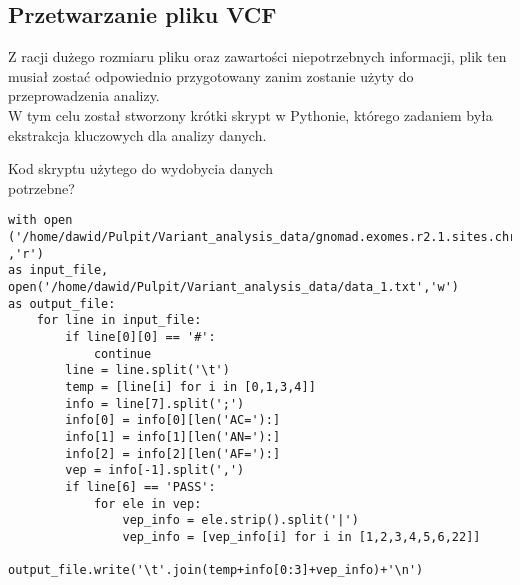 \documentclass[12pt]{article}
\begin{document}
\subsection{Przetwarzanie pliku VCF}\indent

Z racji dużego rozmiaru pliku oraz zawartości niepotrzebnych informacji, plik ten musiał zostać odpowiednio przygotowany zanim zostanie użyty do przeprowadzenia analizy. \\ 
W tym celu został stworzony krótki skrypt w Pythonie, którego zadaniem była ekstrakcja kluczowych dla analizy danych.


Kod skryptu użytego do wydobycia danych \\
potrzebne?
\begin{verbatim}
with open
('/home/dawid/Pulpit/Variant_analysis_data/gnomad.exomes.r2.1.sites.chr21.vcf' ,'r')
as input_file,
open('/home/dawid/Pulpit/Variant_analysis_data/data_1.txt','w')
as output_file:
    for line in input_file:
        if line[0][0] == '#':
            continue
        line = line.split('\t')
        temp = [line[i] for i in [0,1,3,4]]
        info = line[7].split(';')
        info[0] = info[0][len('AC='):]
        info[1] = info[1][len('AN='):]
        info[2] = info[2][len('AF='):]
        vep = info[-1].split(',')
        if line[6] == 'PASS':
            for ele in vep:
                vep_info = ele.strip().split('|')
                vep_info = [vep_info[i] for i in [1,2,3,4,5,6,22]]
                output_file.write('\t'.join(temp+info[0:3]+vep_info)+'\n')    

\end{verbatim}
\end{document}
